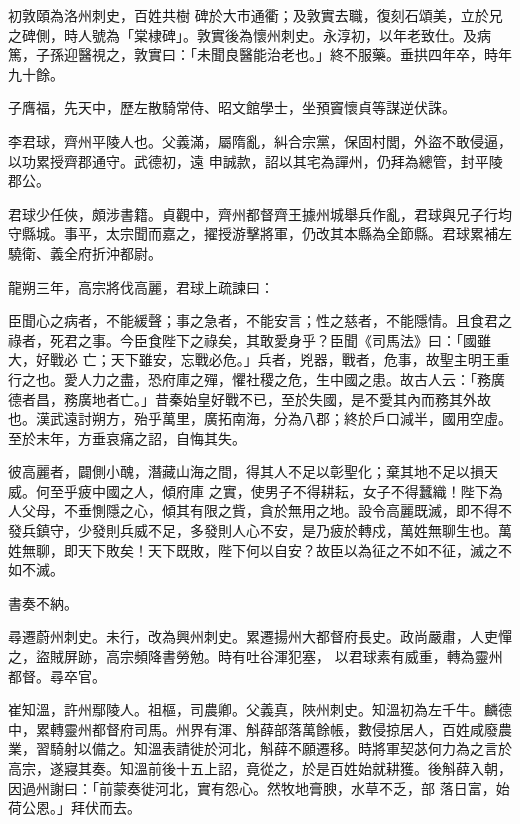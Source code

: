 \begin{pinyinscope}
 初敦頤為洛州刺史，百姓共樹
 碑於大市通衢；及敦實去職，復刻石頌美，立於兄之碑側，時人號為「棠棣碑」。敦實後為懷州刺史。永淳初，以年老致仕。及病篤，子孫迎醫視之，敦實曰：「未聞良醫能治老也。」終不服藥。垂拱四年卒，時年九十餘。



 子膺福，先天中，歷左散騎常侍、昭文館學士，坐預竇懷貞等謀逆伏誅。



 李君球，齊州平陵人也。父義滿，屬隋亂，糾合宗黨，保固村閭，外盜不敢侵逼，以功累授齊郡通守。武德初，遠
 申誠款，詔以其宅為譂州，仍拜為總管，封平陵郡公。



 君球少任俠，頗涉書籍。貞觀中，齊州都督齊王據州城舉兵作亂，君球與兄子行均守縣城。事平，太宗聞而嘉之，擢授游擊將軍，仍改其本縣為全節縣。君球累補左驍衛、義全府折沖都尉。



 龍朔三年，高宗將伐高麗，君球上疏諫曰：



 臣聞心之病者，不能緩聲；事之急者，不能安言；性之慈者，不能隱情。且食君之祿者，死君之事。今臣食陛下之祿矣，其敢愛身乎？臣聞《司馬法》曰：「國雖大，好戰必
 亡；天下雖安，忘戰必危。」兵者，兇器，戰者，危事，故聖主明王重行之也。愛人力之盡，恐府庫之殫，懼社稷之危，生中國之患。故古人云：「務廣德者昌，務廣地者亡。」昔秦始皇好戰不已，至於失國，是不愛其內而務其外故也。漢武遠討朔方，殆乎萬里，廣拓南海，分為八郡；終於戶口減半，國用空虛。至於末年，方垂哀痛之詔，自悔其失。



 彼高麗者，闢側小醜，潛藏山海之間，得其人不足以彰聖化；棄其地不足以損天威。何至乎疲中國之人，傾府庫
 之實，使男子不得耕耘，女子不得蠶織！陛下為人父母，不垂惻隱之心，傾其有限之貲，貪於無用之地。設令高麗既滅，即不得不發兵鎮守，少發則兵威不足，多發則人心不安，是乃疲於轉戍，萬姓無聊生也。萬姓無聊，即天下敗矣！天下既敗，陛下何以自安？故臣以為征之不如不征，滅之不如不滅。



 書奏不納。



 尋遷蔚州刺史。未行，改為興州刺史。累遷揚州大都督府長史。政尚嚴肅，人吏憚之，盜賊屏跡，高宗頻降書勞勉。時有吐谷渾犯塞，
 以君球素有威重，轉為靈州都督。尋卒官。



 崔知溫，許州鄢陵人。祖樞，司農卿。父義真，陜州刺史。知溫初為左千牛。麟德中，累轉靈州都督府司馬。州界有渾、斛薛部落萬餘帳，數侵掠居人，百姓咸廢農業，習騎射以備之。知溫表請徙於河北，斛薛不願遷移。時將軍契苾何力為之言於高宗，遂寢其奏。知溫前後十五上詔，竟從之，於是百姓始就耕獲。後斛薛入朝，因過州謝曰：「前蒙奏徙河北，實有怨心。然牧地膏腴，水草不乏，部
 落日富，始荷公恩。」拜伏而去。




\end{pinyinscope}
